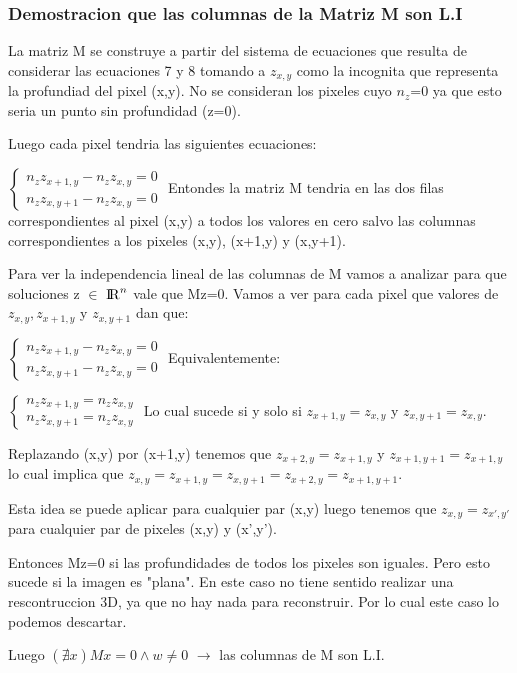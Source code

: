 \subsubsection{Demostracion que las columnas de la Matriz M son L.I}
\indent La matriz M se construye a partir del sistema de ecuaciones que resulta de considerar las ecuaciones 7 y 8 tomando a $z_{x,y}$ como la incognita que representa la profundiad del pixel (x,y). No se consideran los pixeles cuyo $n_{z}$=0 ya que esto seria un punto sin profundidad (z=0). \par
\indent Luego cada pixel tendria las siguientes ecuaciones:\par
$\begin{cases}
n_{z} z_{x+1,y} - n_{z} z_{x,y}=0\\
n_{z} z_{x,y+1} - n_{z} z_{x,y}=0
\end{cases}$
\break
\indent Entondes la matriz M tendria en las dos filas correspondientes al pixel (x,y) a todos los valores en cero salvo las columnas correspondientes a los pixeles (x,y), (x+1,y) y (x,y+1). \par
\indent Para ver la independencia lineal de las columnas de M vamos a analizar para que soluciones z $\in$ ${\rm I\!R}^{n}$ vale que Mz=0. Vamos a ver para cada pixel que valores de $z_{x,y} , z_{x+1,y}$  y $z_{x,y+1}$ dan que: \par
$\begin{cases}
n_{z} z_{x+1,y} - n_{z} z_{x,y}=0\\
n_{z} z_{x,y+1} - n_{z} z_{x,y}=0
\end{cases}$
\break
Equivalentemente:\par
$\begin{cases}
n_{z} z_{x+1,y} = n_{z} z_{x,y}\\
n_{z} z_{x,y+1} = n_{z} z_{x,y}
\end{cases}$
\break
\indent Lo cual sucede si y solo si $z_{x+1,y} = z_{x,y}$ y $z_{x,y+1} = z_{x,y}$. \par
Replazando (x,y) por (x+1,y) tenemos que $z_{x+2,y} = z_{x+1,y}$ y $z_{x+1,y+1} = z_{x+1,y}$ lo cual implica que $z_{x,y}=z_{x+1,y} =z_{x,y+1}= z_{x+2,y} = z_{x+1,y+1}$.\par
Esta idea se puede aplicar para cualquier par (x,y) luego tenemos que $z_{x,y} = z_{x',y'}$ para cualquier par de pixeles (x,y) y (x',y').\par
\indent Entonces  Mz=0 si las profundidades de todos los pixeles son iguales. Pero esto sucede si la imagen es "plana". En este caso no tiene sentido realizar una rescontruccion 3D, ya que no hay nada para reconstruir. Por lo cual este caso lo podemos descartar.\par
\indent Luego  $(\nexists x ) Mx = 0 \land w \neq 0 $ $\rightarrow$ las columnas de M son L.I.


